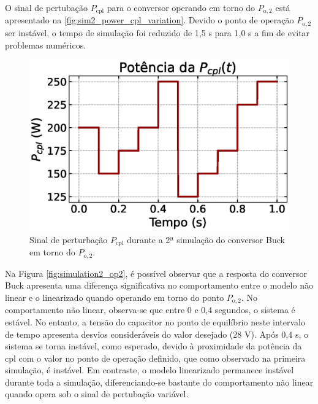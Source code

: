 O sinal de pertubação $P_{\mathrm{cpl}}$ para o conversor operando em torno do $P_{\mathrm{o}, 2}$ está apresentado na \autoref{fig:sim2_power_cpl_variation}. Devido o ponto de operação $P_{\mathrm{o}, 2}$ ser instável, o tempo de simulação foi reduzido de 1,5 s para 1,0 s a fim de evitar problemas numéricos.

\begin{figure}[H]
  \centering
  \captionsetup{justification=centering}
  \includegraphics[width=.5\textwidth]{figuras/buck/sim2/op2/power_cpl_variation.eps}
  \caption{Sinal de perturbação $P_{\mathrm{cpl}}$ durante a 2ª simulação do conversor Buck em torno do $P_{\mathrm{o}, 2}$.}
  \label{fig:sim2_power_cpl_variation}
\end{figure}

Na Figura \ref{fig:simulation2_op2}, é possível observar que a resposta do conversor Buck apresenta uma diferença significativa no comportamento entre o modelo não linear e o linearizado quando operando em torno do ponto $P_{\mathrm{o}, 2}$. No comportamento não linear, observa-se que entre 0 e 0,4 segundos, o sistema é estável. No entanto, a tensão do capacitor no ponto de equilíbrio neste intervalo de tempo apresenta desvios consideráveis do valor desejado (28 V). Após 0,4 s, o sistema se torna instável, como esperado, devido à proximidade da potência da \acrshort{cpl} com o valor no ponto de operação definido, que como observado na primeira simulação, é instável. Em contraste, o modelo linearizado permanece instável durante toda a simulação, diferenciando-se bastante do comportamento não linear quando opera sob o sinal de pertubação variável.

